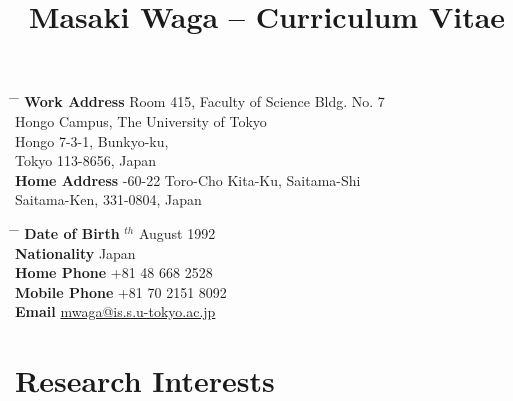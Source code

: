 \documentclass[10pt]{article} %
\begin{document}

\title{Masaki Waga -- Curriculum Vitae} %


\parbox{0.5\textwidth}{ %
\begin{tabbing} %
\hspace{3cm} \= \hspace{4cm} \= \kill %
{\bf Work Address} \> Room 415, Faculty of Science Bldg. No. 7\\
\>Hongo Campus, The University of Tokyo\\
\> Hongo 7-3-1, Bunkyo-ku,\\
\> Tokyo 113-8656, Japan\\
{\bf Home Address} -60-22 Toro-Cho Kita-Ku, Saitama-Shi \\ %
\> Saitama-Ken, 331-0804, Japan \\ %
\end{tabbing}}
\hfill %
\parbox{0.5\textwidth}{ %
\begin{tabbing} %
\hspace{3cm} \= \hspace{4cm} \= \kill %
{\bf Date of Birth} $^{th}$ August 1992 \\ %
{\bf Nationality} \> Japan\\ %
{\bf Home Phone} \> +81 48 668 2528 \\ %
{\bf Mobile Phone} \> +81 70 2151 8092\\ %
{\bf Email} \> \href{mailto:mwaga@is.s.u-tokyo.ac.jp}{mwaga@is.s.u-tokyo.ac.jp} \\ %
\end{tabbing}}


\section{Research Interests}
\end{document}
